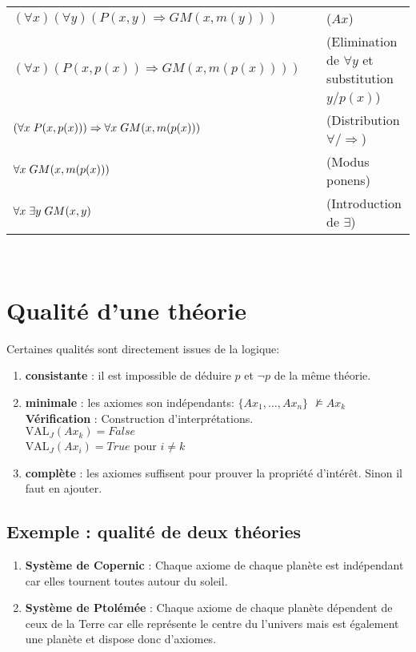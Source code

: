 \begin{tabular}{lll}
$(\forall x)(\forall y) \left(P(x,y)\Rightarrow GM(x, m(y)) \right)$&\hspace*{1cm}&($Ax$)\\
$(\forall x) \left(P(x,p(x))\Rightarrow GM(x, m(p(x))) \right)$&\hspace*{1cm}&(Elimination de $\forall y$ et substitution $y/p(x)$)\\
$\left( \forall x \hspace*{0.1cm} P(x,p(x)) \right)\Rightarrow \forall x \hspace*{0.1cm} GM(x,m(p(x)))$&\hspace*{1cm}&(Distribution $\forall/\Rightarrow$)\\
$\forall x \hspace*{0.1cm} GM(x,m(p(x)))$&\hspace*{1cm}&(Modus ponens)\\
$\forall x \hspace*{0.1cm} \exists y \hspace*{0.1cm} GM(x,y)$&\hspace*{1cm}&(Introduction de $\exists$)\\
\end{tabular}\\

\section{Qualité d'une théorie}
Certaines qualités sont directement issues de la logique:
\begin {enumerate}
\item {\textbf{consistante}} : il est impossible de déduire \(p\) et \(\neg p\)  de la même théorie.
\item {\textbf{minimale}} : les axiomes son indépendants: 
$\{Ax_1, \hdots, Ax_n\}$   $\nvDash Ax_k $\\
\textbf{Vérification} : Construction d'interprétations.\\
$\text{VAL}_J (Ax_k)= False$\\
$\text{VAL}_J (Ax_i)= True$  
pour $i \neq k$
\item {\textbf{complète}} : les axiomes suffisent pour prouver la propriété d'intérêt. Sinon il faut en ajouter.
\end {enumerate}
\subsection{Exemple : qualité de deux théories}
\begin {enumerate}
\item {\textbf{Système de Copernic}} : Chaque axiome de chaque planète est indépendant car elles tournent toutes autour du soleil.
\item{\textbf{Système de Ptolémée}} : Chaque axiome de chaque planète dépendent de ceux de la Terre car elle représente le centre du l'univers mais est également une planète et dispose donc d'axiomes.
\end {enumerate}
